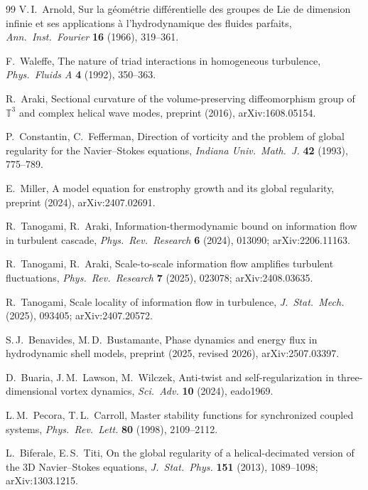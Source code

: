 \documentclass[11pt]{article}
\theoremstyle{definition}
\theoremstyle{remark}
\begin{document}
\begin{thebibliography}{99}
 V.\,I.~Arnold, Sur la g\'eom\'etrie
  diff\'erentielle des groupes de Lie de dimension infinie et ses
  applications \`a l'hydrodynamique des fluides parfaits,
  \textit{Ann.\ Inst.\ Fourier} \textbf{16} (1966), 319--361.

 F.~Waleffe, The nature of triad interactions
  in homogeneous turbulence, \textit{Phys.\ Fluids A} \textbf{4}
  (1992), 350--363.

 R.~Araki, Sectional curvature of the
  volume-preserving diffeomorphism group of $\mathbb{T}^3$ and
  complex helical wave modes, preprint (2016), arXiv:1608.05154.

 P.~Constantin, C.~Fefferman,
  Direction of vorticity and the problem of global regularity for the
  Navier--Stokes equations, \textit{Indiana Univ.\ Math.\ J.}
  \textbf{42} (1993), 775--789.

 E.~Miller, A model equation for enstrophy
  growth and its global regularity, preprint (2024), arXiv:2407.02691.

 R.~Tanogami, R.~Araki,
  Information-thermodynamic bound on information flow in turbulent
  cascade, \textit{Phys.\ Rev.\ Research} \textbf{6} (2024), 013090;
  arXiv:2206.11163.

 R.~Tanogami, R.~Araki, Scale-to-scale
  information flow amplifies turbulent fluctuations,
  \textit{Phys.\ Rev.\ Research} \textbf{7} (2025), 023078;
  arXiv:2408.03635.

 R.~Tanogami, Scale locality of information
  flow in turbulence, \textit{J.\ Stat.\ Mech.} (2025), 093405;
  arXiv:2407.20572.

 S.\,J.~Benavides,
  M.\,D.~Bustamante, Phase dynamics and energy flux in hydrodynamic
  shell models, preprint (2025, revised 2026), arXiv:2507.03397.

 D.~Buaria, J.\,M.~Lawson, M.~Wilczek,
  Anti-twist and self-regularization in three-dimensional
  vortex dynamics, \textit{Sci.\ Adv.} \textbf{10} (2024), eado1969.

 L.\,M.~Pecora, T.\,L.~Carroll,
  Master stability functions for synchronized coupled systems,
  \textit{Phys.\ Rev.\ Lett.} \textbf{80} (1998), 2109--2112.

 L.~Biferale, E.\,S.~Titi,
  On the global regularity of a helical-decimated version of the 3D
  Navier--Stokes equations, \textit{J.\ Stat.\ Phys.}
  \textbf{151} (2013), 1089--1098; arXiv:1303.1215.


\end{thebibliography}
\end{document}
